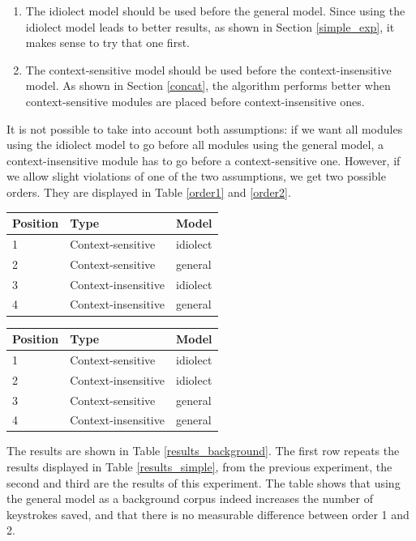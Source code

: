 \documentclass[11pt]{article}
\let\originaltable\table
\let\endoriginaltable\endtable
\renewenvironment{table}[1][ht]{%
  \originaltable[#1]
  \centering}%
  {\endoriginaltable}
\begin{document}
\begin{enumerate}

\item The idiolect model should be used before the general model. Since using the idiolect model leads to better results, as shown in Section \ref{simple_exp}, it makes sense to try that one first.
\item The context-sensitive model should be used before the context-insensitive model. As shown in Section \ref{concat}, the algorithm performs better when context-sensitive modules are placed before context-insensitive ones.

\end{enumerate}

It is not possible to take into account both assumptions: if we want all modules using the idiolect model to go before all modules using the general model, a context-insensitive module has to go before a context-sensitive one. However, if we allow slight violations of one of the two assumptions, we get two possible orders. They are displayed in Table \ref{order1} and \ref{order2}. 

\begin{table}[H]
\begin{tabular}{lll} 
Position&Type&Model\\
\hline
1&Context-sensitive&idiolect\\
2&Context-sensitive&general\\
3&Context-insensitive&idiolect\\
4&Context-insensitive&general\\
\end{tabular} 
\caption{Module order with the general model as background model, version 1} \label{order1}
\end{table}

\begin{table}[H]
\begin{tabular}{lll} 
Position&Type&Model\\
\hline
1&Context-sensitive&idiolect\\
2&Context-insensitive&idiolect\\
3&Context-sensitive&general\\
4&Context-insensitive&general\\
\end{tabular} 
\caption{Module order with the general model as background model, version 2} \label{order2}
\end{table}

The results are shown in Table \ref{results_background}. The first row repeats the results displayed in Table \ref{results_simple}, from the previous experiment, the second and third are the results of this experiment. The table shows that using the general model as a background corpus indeed increases the number of keystrokes saved, and that there is no measurable difference between order 1 and 2.
\end{document}
